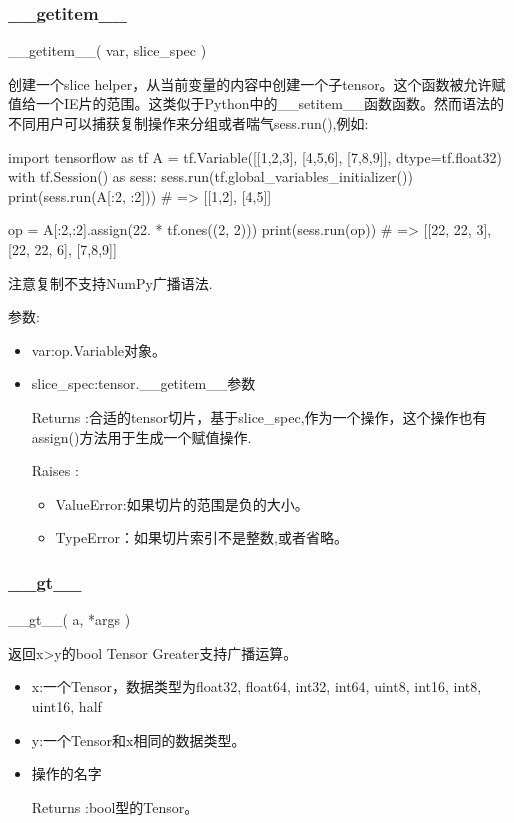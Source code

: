 \subsubsection{\_\_getitem\_\_}
\begin{python}
__getitem__(
    var,
    slice_spec
)
\end{python}
创建一个slice helper，从当前变量的内容中创建一个子tensor。这个函数被允许赋值给一个IE片的范围。这类似于Python中的\_\_setitem\_\_函数函数。然而语法的不同用户可以捕获复制操作来分组或者喘气sess.run(),例如:
\begin{python}
import tensorflow as tf
A = tf.Variable([[1,2,3], [4,5,6], [7,8,9]], dtype=tf.float32)
with tf.Session() as sess:
  sess.run(tf.global_variables_initializer())
  print(sess.run(A[:2, :2]))  # => [[1,2], [4,5]]

  op = A[:2,:2].assign(22. * tf.ones((2, 2)))
  print(sess.run(op))  # => [[22, 22, 3], [22, 22, 6], [7,8,9]]
\end{python}
注意复制不支持NumPy广播语法.

参数:
\begin{itemize}
	\item var:op.Variable对象。
	\item slice\_spec:tensor.\_\_getitem\_\_参数
	\item[Returns]:合适的tensor切片，基于slice\_spec,作为一个操作，这个操作也有assign()方法用于生成一个赋值操作.
	\item[Raises]:
	\begin{itemize}
		\item ValueError:如果切片的范围是负的大小。
		\item TypeError：如果切片索引不是整数,或者省略。
	\end{itemize}
\end{itemize}
\subsubsection{\_\_gt\_\_}
\begin{python}
__gt__(
    a,
    *args
)
\end{python}
返回x>y的bool Tensor Greater支持广播运算。
\begin{itemize}
	\item x:一个Tensor，数据类型为float32, float64, int32, int64, uint8, int16, int8, uint16, half
	\item y:一个Tensor和x相同的数据类型。
	\item 操作的名字
	\item[Returns]:bool型的Tensor。
\end{itemize}
